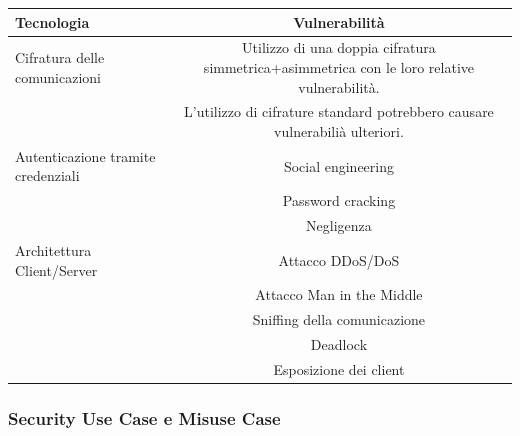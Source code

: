 \documentclass[a4paper]{article}
\begin{document}
\begin{center}
    \begin{tabulary}{1\textwidth}{|L|C|}
        \hline
        \textbf{Tecnologia} & \textbf{Vulnerabilità} \\
        \hline
        \hline
        Cifratura delle comunicazioni & Utilizzo di una doppia cifratura simmetrica+asimmetrica con le loro relative vulnerabilità.\\
                                      & L'utilizzo di cifrature standard potrebbero causare vulnerabilià ulteriori.\\
        \hline
        Autenticazione tramite credenziali & Social engineering \\
                                           & Password cracking \\
                                           & Negligenza \\
        \hline
        Architettura Client/Server & Attacco DDoS/DoS \\
                                   & Attacco Man in the Middle\\
                                   & Sniffing della comunicazione\\
                                   & Deadlock\\
                                   & Esposizione dei client\\
        \hline
    \end{tabulary}
\end{center}

\subsubsection{Security Use Case e Misuse Case}

\end{document}
